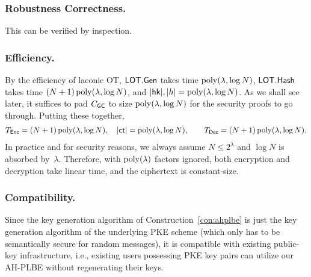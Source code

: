 \subsubsection{Robustness Correctness.}
This can be verified by inspection.

\subsubsection{Efficiency.}
By the efficiency of laconic OT,
${\smash{\mathsf{LOT}}}.{\smash{\mathsf{Gen}}}$ takes time $\operatorname{poly}(\lambda,\log N)$,
${\smash{\mathsf{LOT}}}.{\smash{\mathsf{Hash}}}$ takes time $({N+1})\operatorname{poly}(\lambda,\log N)$, and
${|{\smash{\mathsf{hk}}}|,|h|=\operatorname{poly}(\lambda,\log N)}$.
As we shall see later, it suffices to pad $C_{\smash{\mathsf{GC}}}$ to size $\operatorname{poly}(\lambda,\log N)$ for the security proofs to go through.
Putting these together,
\begin{align*}
T_\Enc
\WideNarrow{}{&{}}
=({N+1})\poly(\lambda,\log N),
\WideNarrow{\quad}{\qquad}
|\ct|=\poly(\lambda,\log N),
\WideNarrow{\qquad}{\\}
T_\Dec
\WideNarrow{}{&{}}
=({N+1})\poly(\lambda,\log N).
\end{align*}
In practice and for security reasons,
we always assume ${N\leq 2^\lambda}$ and ${\log N}$ is absorbed by~$\lambda$.
Therefore, with $\operatorname{poly}(\lambda)$ factors ignored,
both encryption and decryption take linear time,
and the ciphertext is constant-size.

\subsubsection{Compatibility.}
Since the key generation algorithm of Construction~\ref{con:ahplbe} is just the key generation algorithm of the underlying PKE scheme (which only has to be semantically secure for random messages),
it is compatible with existing public-key infrastructure,
i.e., existing users possessing PKE key pairs can utilize our AH-PLBE without regenerating their keys.
